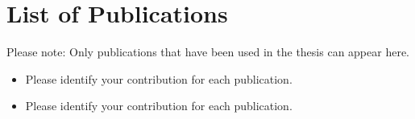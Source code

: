 \chapter*{List of Publications}

Please note: Only publications that have been used in the thesis can appear here.

\begin{itemize}
    \item {}

	Please identify your contribution for each publication.

    \item {}

	Please identify your contribution for each publication.
\end{itemize}
